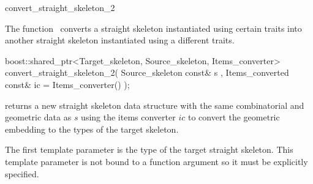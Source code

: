 

\begin{ccRefFunction}{convert_straight_skeleton_2}


\ccDefinition

The function \ccRefName\ converts a straight skeleton instantiated using certain traits into another straight skeleton instantiated using a different traits.


\ccFunction
{boost::shared_ptr<Target_skeleton, Source_skeleton, Items_converter>
 convert_straight_skeleton_2( Source_skeleton const& s
                            , Items_converted const& ic = Items_converter()
                            );
}
{ returns a new straight skeleton data structure with the same combinatorial and geometric data as $s$ using the items converter $ic$ to convert the geometric embedding to the types of the target skeleton.

The first template parameter is the type of the target straight skeleton. This template parameter is not bound to a function argument so it must be explicitly specified.
}

\ccSeeAlso
{}\\
\\
\\

\end{ccRefFunction}


